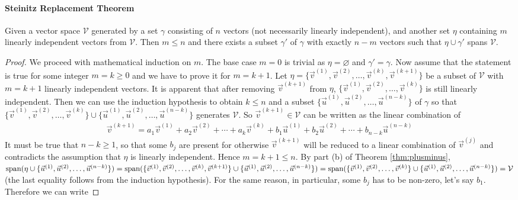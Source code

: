 \paragraph{Steinitz Replacement Theorem}

\begin{thm}
\label{thm:Steinitz}
Given a vector space $\mathcal{V}$ generated by a set $\mathcal{\gamma}$ consisting of $n$ vectors (not necessarily linearly independent), and another set $\mathcal{\eta}$ containing $m$ linearly independent vectors from $\mathcal{V}$. Then $m \leq n$ and there exists a subset $\mathcal{\gamma'}$ of $\mathcal{\gamma}$ with exactly $n-m$ vectors such that $\mathcal{\eta} \cup \mathcal{\gamma'}$ spans $\mathcal{V}$.
\end{thm}
\begin{proof}
We proceed with mathematical induction on $m$. The base case $m = 0$ is trivial as $\mathcal{\eta} = \varnothing$ and $\mathcal{\gamma'} = \mathcal{\gamma}$. Now assume that the statement is true for some integer $m = k \geq 0$ and we have to prove it for $m = k+1$. Let $\mathcal{\eta} = \{\vec{v}^{(1)}, \vec{v}^{(2)}, \ldots, \vec{v}^{(k)}, \vec{v}^{(k+1)}\}$ be a subset of $\mathcal{V}$ with $m = k+1$ linearly independent vectors. It is apparent that after removing $\vec{v}^{(k+1)}$ from $\mathcal{\eta}$, $\{\vec{v}^{(1)}, \vec{v}^{(2)}, \ldots, \vec{v}^{(k)}\}$ is still linearly independent. Then we can use the induction hypothesis to obtain $k \leq n$ and a subset $\{\vec{u}^{(1)}, \vec{u}^{(2)}, \ldots, \vec{u}^{(n-k)}\}$ of $\mathcal{\gamma}$ so that $\{\vec{v}^{(1)}, \vec{v}^{(2)}, \ldots, \vec{v}^{(k)}\} \cup \{\vec{u}^{(1)}, \vec{u}^{(2)}, \ldots, \vec{u}^{(n-k)}\}$ generates $\mathcal{V}$. So $\vec{v}^{(k+1)} \in \mathcal{V}$ can be written as the linear combination of
\begin{align*}
\vec{v}^{(k+1)} = a_1\vec{v}^{(1)} + a_2\vec{v}^{(2)} + \cdots + a_k\vec{v}^{(k)} + b_1\vec{u}^{(1)} + b_2\vec{u}^{(2)} + \cdots + b_{n-k}\vec{u}^{(n-k)} 
\end{align*}
It must be true that $n - k \geq 1$, so that some $b_j$ are present for otherwise $\vec{v}^{(k+1)}$ will be reduced to a linear combination of $\vec{v}^{(j)}$ and contradicts the assumption that $\mathcal{\eta}$ is linearly independent. Hence $m = k + 1 \leq n$. By part (b) of Theorem \ref{thm:plusminus}, $\text{span}(\mathcal{\eta} \cup \{\vec{u}^{(1)}, \vec{u}^{(2)}, \ldots, \vec{u}^{(n-k)}\}) = \text{span}(\{\vec{v}^{(1)}, \vec{v}^{(2)}, \ldots, \vec{v}^{(k)}, \vec{v}^{(k+1)}\} \cup \{\vec{u}^{(1)}, \vec{u}^{(2)}, \ldots, \vec{u}^{(n-k)}\}) = \text{span}(\{\vec{v}^{(1)}, \vec{v}^{(2)}, \ldots, \vec{v}^{(k)}\} \cup \{\vec{u}^{(1)}, \vec{u}^{(2)}, \ldots, \vec{u}^{(n-k)}\}) \\ = \mathcal{V}$ (the last equality follows from the induction hypothesis). For the same reason, in particular, some $b_j$ has to be non-zero, let's say $b_1$. Therefore we can write

\end{proof}

